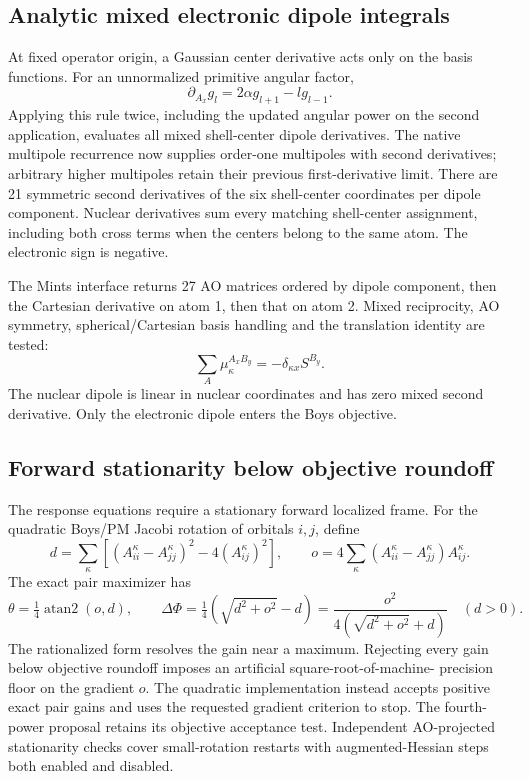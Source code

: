 \documentclass[11pt]{article}
\begin{document}
\subsection{Analytic mixed electronic dipole integrals}
At fixed operator origin, a Gaussian center derivative acts only on the
basis functions. For an unnormalized primitive angular factor,
\begin{equation}
 \partial_{A_x}g_l=2\alpha g_{l+1}-l g_{l-1}.
\end{equation}
Applying this rule twice, including the updated angular power on the
second application, evaluates all mixed shell-center dipole derivatives.
The native multipole recurrence now supplies order-one multipoles with
second derivatives; arbitrary higher multipoles retain their previous
first-derivative limit. There are 21 symmetric second derivatives of the
six shell-center coordinates per dipole component. Nuclear derivatives
sum every matching shell-center assignment, including both cross terms
when the centers belong to the same atom. The electronic sign is negative.

The Mints interface returns 27 AO matrices ordered by dipole component,
then the Cartesian derivative on atom 1, then that on atom 2. Mixed
reciprocity, AO symmetry, spherical/Cartesian basis handling and the
translation identity are tested:
\begin{equation}
 \sum_A \mu_\kappa^{A_x B_y}=-\delta_{\kappa x}S^{B_y}.
\end{equation}
The nuclear dipole is linear in nuclear coordinates and has zero mixed
second derivative. Only the electronic dipole enters the Boys objective.

\subsection{Forward stationarity below objective roundoff}
The response equations require a stationary forward localized frame. For
the quadratic Boys/PM Jacobi rotation of orbitals $i,j$, define
\begin{equation}
 d=\sum_\kappa\left[(A^\kappa_{ii}-A^\kappa_{jj})^2
                         -4(A^\kappa_{ij})^2\right],\qquad
 o=4\sum_\kappa(A^\kappa_{ii}-A^\kappa_{jj})A^\kappa_{ij}.
\end{equation}
The exact pair maximizer has
\begin{equation}
 \theta=\tfrac14\operatorname{atan2}(o,d),\qquad
 \Delta\Phi=\tfrac14\left(\sqrt{d^2+o^2}-d\right)
 =\frac{o^2}{4(\sqrt{d^2+o^2}+d)}\quad(d>0).
\end{equation}
The rationalized form resolves the gain near a maximum. Rejecting every
gain below objective roundoff imposes an artificial square-root-of-machine-
precision floor on the gradient $o$. The quadratic implementation instead
accepts positive exact pair gains and uses the requested gradient criterion
to stop. The fourth-power proposal retains its objective acceptance test.
Independent AO-projected stationarity checks cover small-rotation restarts
with augmented-Hessian steps both enabled and disabled.
\end{document}
